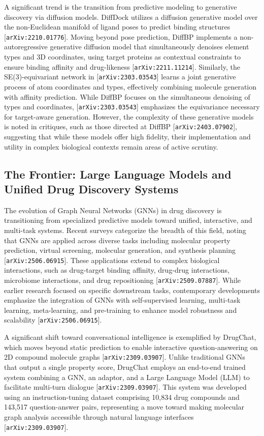 \documentclass[11pt]{article}
\begin{document}
A significant trend is the transition from predictive modeling to generative discovery via diffusion models. DiffDock utilizes a diffusion generative model over the non-Euclidean manifold of ligand poses to predict binding structures [\texttt{arXiv:2210.01776}]. Moving beyond pose prediction, DiffBP implements a non-autoregressive generative diffusion model that simultaneously denoises element types and 3D coordinates, using target proteins as contextual constraints to ensure binding affinity and drug-likeness [\texttt{arXiv:2211.11214}]. Similarly, the SE(3)-equivariant network in [\texttt{arXiv:2303.03543}] learns a joint generative process of atom coordinates and types, effectively combining molecule generation with affinity prediction. While DiffBP focuses on the simultaneous denoising of types and coordinates, [\texttt{arXiv:2303.03543}] emphasizes the equivariance necessary for target-aware generation. However, the complexity of these generative models is noted in critiques, such as those directed at DiffBP [\texttt{arXiv:2403.07902}], suggesting that while these models offer high fidelity, their implementation and utility in complex biological contexts remain areas of active scrutiny.

\subsection{The Frontier: Large Language Models and Unified Drug Discovery Systems}

The evolution of Graph Neural Networks (GNNs) in drug discovery is transitioning from specialized predictive models toward unified, interactive, and multi-task systems. Recent surveys categorize the breadth of this field, noting that GNNs are applied across diverse tasks including molecular property prediction, virtual screening, molecular generation, and synthesis planning [\texttt{arXiv:2506.06915}]. These applications extend to complex biological interactions, such as drug-target binding affinity, drug-drug interactions, microbiome interactions, and drug repositioning [\texttt{arXiv:2509.07887}]. While earlier research focused on specific downstream tasks, contemporary developments emphasize the integration of GNNs with self-supervised learning, multi-task learning, meta-learning, and pre-training to enhance model robustness and scalability [\texttt{arXiv:2506.06915}].

A significant shift toward conversational intelligence is exemplified by DrugChat, which moves beyond static prediction to enable interactive question-answering on 2D compound molecule graphs [\texttt{arXiv:2309.03907}]. Unlike traditional GNNs that output a single property score, DrugChat employs an end-to-end trained system combining a GNN, an adaptor, and a Large Language Model (LLM) to facilitate multi-turn dialogue [\texttt{arXiv:2309.03907}]. This system was developed using an instruction-tuning dataset comprising 10,834 drug compounds and 143,517 question-answer pairs, representing a move toward making molecular graph analysis accessible through natural language interfaces [\texttt{arXiv:2309.03907}].
\end{document}
